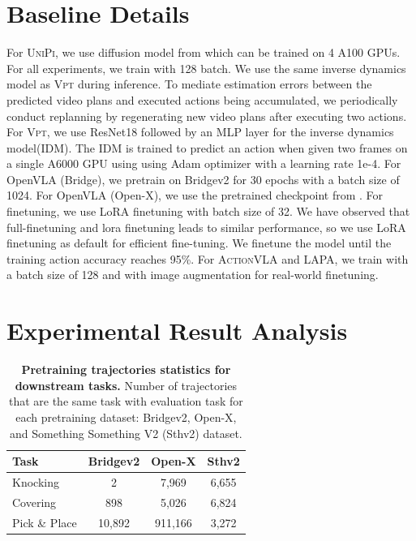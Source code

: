 \documentclass{article} %
\begin{document}
\section{Baseline Details}
\label{appen:baseline}
For \textsc{UniPi}, we use diffusion model from \citep{ko2024learning} which can be trained on 4 A100 GPUs. For all experiments, we train with 128 batch. We use the same inverse dynamics model as \textsc{Vpt} during inference. To mediate estimation errors between the predicted video plans and executed actions being accumulated, we periodically conduct replanning by regenerating new video plans after executing two actions.  For \textsc{Vpt}, we use ResNet18 followed by an MLP layer for the inverse dynamics model(IDM). The IDM is trained to predict an action when given two frames on a single A6000 GPU using using Adam optimizer with a
learning rate 1e-4. For OpenVLA (Bridge), we pretrain on Bridgev2 for 30 epochs with a batch size of 1024. For OpenVLA (Open-X), we use the pretrained checkpoint from \citet{kim2024OpenVLA}. For finetuning, we use LoRA finetuning \citep{hu2022lora} with batch size of 32. We have observed that full-finetuning and lora finetuning leads to similar performance, so we use LoRA finetuning as default for efficient fine-tuning. We finetune the model until the training action accuracy reaches 95\%. For \textsc{ActionVLA} and \textsc{LAPA}, we train with a batch size of 128 and with image augmentation for real-world finetuning.


\section{Experimental Result Analysis}

\begin{table}[h]
\centering
\caption{\textbf{Pretraining trajectories statistics for downstream tasks.} Number of trajectories that are the same task with evaluation task for each pretraining dataset: Bridgev2, Open-X, and Something Something V2 (Sthv2) dataset.}
\begin{tabular}{lccc}
\toprule
Task & Bridgev2 & Open-X & Sthv2 \\
\midrule
Knocking & 2 & 7,969 & 6,655 \\
Covering & 898 & 5,026 & 6,824 \\
Pick \& Place & 10,892 & 911,166 & 3,272 \\
\bottomrule
\end{tabular}
\label{tab:task_freq}
\end{table}
\end{document}
